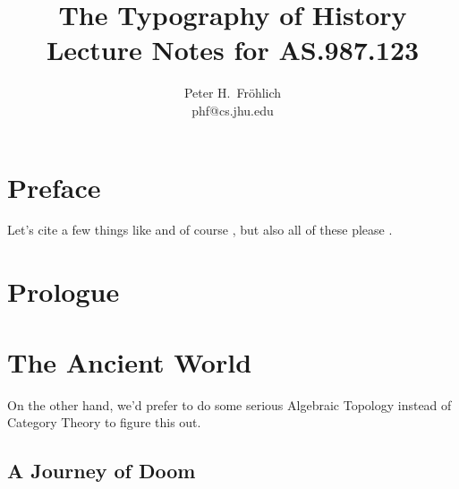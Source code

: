 \documentclass[11pt]{book}
\title{\textbf{The Typography of History}\\
Lecture Notes for AS.987.123}
\author{Peter H.\ Fr{\"o}hlich\\
phf@cs.jhu.edu}
\begin{document}
\frontmatter

\maketitle

\chapter*{Preface}

\lipsum[1]

Let's cite a few things like \cite{kant02} and of
course \cite{lamport94}, but also all of these
please \cite{Conway2000,Meyer2000,Huetal2000,LaTeXe,lshort,Gill}.
\lipsum[3-4]

\tableofcontents
\listoffigures
\listoftables

\mainmatter

\chapter{Prologue}
\lipsum[1-10]

\chapter{The Ancient World}
\lipsum[2]

On the other hand, we'd prefer to do some
serious Algebraic Topology
instead of Category Theory to figure this out.

\section{A Journey of Doom}
\lipsum[1-4]
\end{document}
